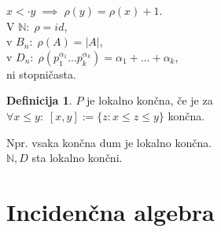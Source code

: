 \documentclass[a4paper, 12pt]{book}
\theoremstyle{definition}
\newtheorem{defn}[counter]{Definicija}
\theoremstyle{remark}
\newcommand{\N}{\mathbb{N}}
\begin{document}
$x <\cdot y \; \implies \; \rho(y) = \rho(x) + 1$. \\
V $\N: \; \rho = id$, \\
v $B_n: \; \rho(A) = |A|$, \\
v $D_n: \; \rho\left(p_1^{\alpha_1} \dots p_k^{\alpha_k}\right) = \alpha_1 + \dots + \alpha_k$, \\
ni stopničasta.
\begin{defn}
  $P$ je lokalno končna, če je za \\
  $\forall x \leq y: \; [x,y] := \{z: x \leq z \leq y\}$ končna.
\end{defn}
Npr. vsaka končna dum je lokalno končna. \\
$\N, D$ sta lokalno končni.


\section{Incidenčna algebra}
\end{document}
